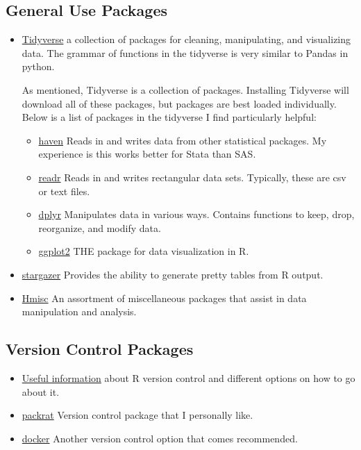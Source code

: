 \documentclass{report}
\begin{document}
\subsection{General Use Packages}
\begin{itemize}

    \item \href{https://www.tidyverse.org/}{Tidyverse} a collection of packages for cleaning, manipulating, and visualizing data.  The grammar of functions in the tidyverse is very similar to Pandas in python.   
    
    As mentioned, Tidyverse is a collection of packages.  Installing Tidyverse will download all of these packages, but packages are best loaded individually.  Below is a list of packages in the tidyverse I find particularly helpful:
    \begin{itemize}
        \item \href{https://haven.tidyverse.org/}{haven} Reads in and writes data from other statistical packages. My experience is this works better for Stata than SAS.
        \item \href{https://readr.tidyverse.org/}{readr} Reads in and writes rectangular data sets.  Typically, these are csv or text files.
        \item \href{https://cran.r-project.org/web/packages/dplyr/vignettes/dplyr.html}{dplyr} Manipulates data in various ways.  Contains functions to keep, drop, reorganize, and modify data.
        \item 
        \href{https://ggplot2.tidyverse.org/}{ggplot2}  THE package for data visualization in R.
    \end{itemize}
    
    \item \href{https://cran.r-project.org/web/packages/stargazer/vignettes/stargazer.pdf}{stargazer} Provides the ability to generate pretty tables from R output.
    \item \href{https://cran.r-project.org/web/packages/Hmisc/Hmisc.pdf}{Hmisc} An assortment of miscellaneous packages that assist in data manipulation and analysis.
    
    \end{itemize}
    \subsection{Version Control Packages}
    \begin{itemize}
    \item \href{https://rviews.rstudio.com/2018/01/18/package-management-for-reproducible-r-code/}{Useful information} about R version control and different options on how to go about it.
    \item \href{https://cran.r-project.org/web/packages/packrat/packrat.pdf}{packrat} Version control package that I personally like.
    \item \href{https://docs.docker.com/install/}{docker} Another version control option that comes recommended.
    \end{itemize}
\end{document}
